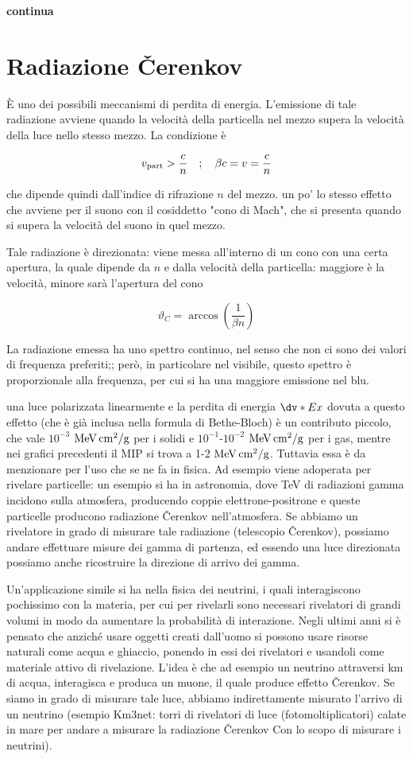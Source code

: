 \textbf{continua}

\section{Radiazione Čerenkov}

È uno dei possibili meccanismi di perdita di energia. L'emissione di tale radiazione avviene quando la velocità della particella nel mezzo supera la velocità della luce nello stesso mezzo. La condizione è

$$v_{\rm part} > \frac{c}{n}
\quad;\quad
\beta c=v=\frac{c}{n}$$

che dipende quindi dall'indice di rifrazione $n$ del mezzo. \E un po' lo stesso effetto che avviene per il suono con il cosiddetto "cono di Mach", che si presenta quando si supera la velocità del suono in quel mezzo.

Tale radiazione è direzionata: viene messa all'interno di un cono con una certa apertura, la quale dipende da $n$ e dalla velocità della particella: maggiore è la velocità, minore sarà l'apertura del cono

$$\vartheta_C=\arccos{\left(\frac{1}{\beta n}\right)}$$

La radiazione emessa ha uno spettro continuo, nel senso che non ci sono dei valori di frequenza preferiti;; però, in particolare nel visibile, questo spettro è proporzionale alla frequenza, per cui si ha una maggiore emissione nel blu.

\E una luce polarizzata linearmente e la perdita di energia $\dv*{E}{x}$ dovuta a questo effetto (che è già inclusa nella formula di Bethe-Bloch) è un contributo piccolo, che vale $10^{-3}$ $\rm MeV \, cm^2/g$ per i solidi e $10^{-1}$-$10^{-2}$ $\rm MeV \, cm^2/g$ per i gas, mentre nei grafici precedenti il MIP si trova a 1-2 $\rm MeV \, cm^2/g$. Tuttavia essa è da menzionare per l'uso che se ne fa in fisica. Ad esempio viene adoperata per rivelare particelle: un esempio si ha in astronomia, dove TeV di radiazioni gamma incidono sulla atmosfera, producendo coppie elettrone-positrone e queste particelle producono radiazione Čerenkov nell'atmosfera. Se abbiamo un rivelatore in grado di misurare tale radiazione (telescopio Čerenkov), possiamo andare effettuare misure dei gamma di partenza, ed essendo una luce direzionata possiamo anche ricostruire la direzione di arrivo dei gamma.

Un'applicazione simile si ha nella fisica dei neutrini, i quali interagiscono pochissimo con la materia, per cui per rivelarli sono necessari rivelatori di grandi volumi in modo da aumentare la probabilità di interazione. Negli ultimi anni si è pensato che anziché usare oggetti creati dall'uomo si possono usare risorse naturali come acqua e ghiaccio, ponendo in essi dei rivelatori e usandoli come materiale attivo di rivelazione. L'idea è che ad esempio un neutrino attraversi km di acqua, interagisca e produca un muone, il quale produce effetto Čerenkov. Se siamo in grado di misurare tale luce, abbiamo indirettamente misurato l'arrivo di un neutrino (esempio Km3net: torri di rivelatori di luce (fotomoltiplicatori) calate in mare per andare a misurare la radiazione Čerenkov Con lo scopo di misurare i neutrini).

